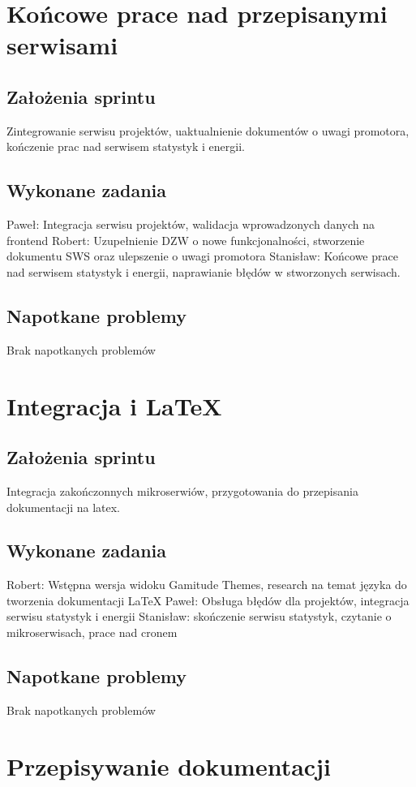 \documentclass[a4paper,11pt]{report}
\begin{document}
\section {Końcowe prace nad przepisanymi serwisami}
\subsection {Założenia sprintu}
Zintegrowanie serwisu projektów, uaktualnienie dokumentów o uwagi promotora, kończenie prac nad serwisem statystyk i energii.
\subsection {Wykonane zadania}
Paweł: Integracja serwisu projektów, walidacja wprowadzonych danych na frontend
Robert: Uzupełnienie DZW o nowe funkcjonalności, stworzenie dokumentu SWS oraz ulepszenie o uwagi promotora
Stanisław: Końcowe prace nad serwisem statystyk i energii, naprawianie błędów w stworzonych serwisach.
\subsection {Napotkane problemy}
Brak napotkanych problemów

\section {Integracja i LaTeX}
\subsection {Założenia sprintu}
Integracja zakończonnych mikroserwiów, przygotowania do przepisania dokumentacji na latex.
\subsection {Wykonane zadania}
Robert: Wstępna wersja widoku Gamitude Themes, research na temat języka do tworzenia dokumentacji LaTeX
Paweł: Obsługa błędów dla projektów, integracja serwisu statystyk i energii
Stanisław: skończenie serwisu statystyk, czytanie o mikroserwisach, prace nad cronem
\subsection {Napotkane problemy}
Brak napotkanych problemów

\section {Przepisywanie dokumentacji}
\end{document}
